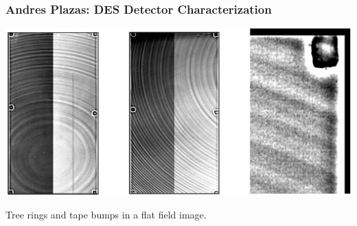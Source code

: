 \documentclass{beamer}
\begin{document}
\frame
{
    \frametitle{Andres Plazas: DES Detector Characterization}

    \includegraphics[width=\textwidth]{flats.png}
    \newline

    \begin{center}
        Tree rings and tape bumps in a flat field image.
    \end{center}
} 
\frame
\end{document}
